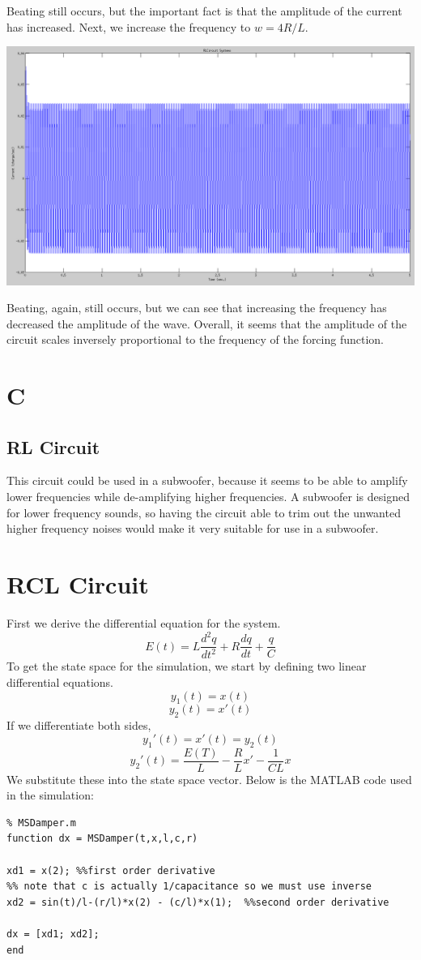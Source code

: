\documentclass[titlepage,12pt]{article}
\begin{document}
\noindent Beating still occurs, but the important fact is that the amplitude of the current has increased. Next, we increase the frequency to $w = 4R/L$.

\begin{center}
  \includegraphics[scale=0.25]{r10l01w4rl.png}
\end{center}

\noindent Beating, again, still occurs, but we can see that increasing the frequency has decreased the amplitude of the wave. Overall, it seems that the amplitude of the circuit scales inversely proportional to the frequency of the forcing function.

\section*{C}

\subsection*{RL Circuit}
\noindent This circuit could be used in a subwoofer, because it seems to be able to amplify lower frequencies while de-amplifying higher frequencies. A subwoofer is designed for lower frequency sounds, so having the circuit able to trim out the unwanted higher frequency noises would make it very suitable for use in a subwoofer.

\pagebreak
\section{RCL Circuit}

First we derive the differential equation for the system.
$$E(t) = L \frac{d^2q}{dt^2} + R\frac{dq}{dt} + \frac{q}{C}$$
To get the state space for the simulation, we start by defining two linear differential equations.
$$y_1(t) = x(t)$$
$$y_2(t) = x'(t)$$
If we differentiate both sides,
$$y_1'(t) = x'(t) = y_2(t)$$
$$y_2'(t) = \frac{E(T)}{L}-\frac{R}{L} x' - \frac{1}{CL}x$$
We substitute these into the state space vector. Below is the MATLAB code used in the simulation:
\begin{verbatim}
% MSDamper.m
function dx = MSDamper(t,x,l,c,r)

xd1 = x(2); %%first order derivative
%% note that c is actually 1/capacitance so we must use inverse
xd2 = sin(t)/l-(r/l)*x(2) - (c/l)*x(1);  %%second order derivative

dx = [xd1; xd2];
end
\end{verbatim}
\end{document}
